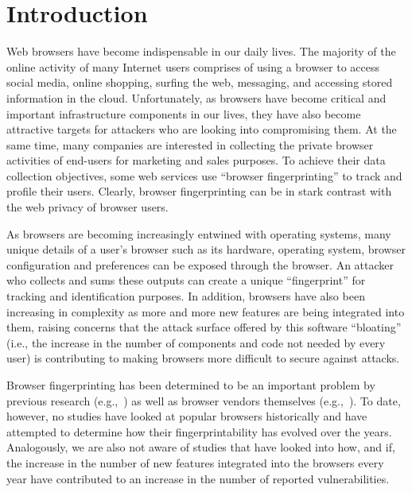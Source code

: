 \section{Introduction}
\label{sec:introduction}

Web browsers have become indispensable in our daily lives. The
majority of the online activity of many Internet users comprises of
using a browser to access social media, online shopping, surfing the
web, messaging, and accessing stored information in the cloud.
Unfortunately, as browsers have become critical and important
infrastructure components in our lives, they have also become
attractive targets for attackers who are looking into compromising
them. At the same time, many companies are interested in collecting
the private browser activities of end-users for marketing and sales
purposes. To achieve their data collection objectives, some web
services use ``browser fingerprinting'' to track and profile their
users. Clearly, browser fingerprinting can be in stark contrast with
the web privacy of browser users.

As browsers are becoming increasingly entwined with operating systems,
many unique details of a user's browser such as its hardware,
operating system, browser configuration and preferences can be exposed
through the browser. An attacker who collects and sums these outputs
can create a unique ``fingerprint'' for tracking and identification
purposes. In addition, browsers have also been increasing in
complexity as more and more new features are being integrated into
them, raising concerns that the attack surface offered by this
software ``bloating'' (i.e., the increase in the number of components
and code not needed by every user) is contributing to making browsers
more difficult to secure against attacks.

Browser fingerprinting has been determined to be an important problem
by previous research
(e.g.,~\cite{cookiemonster-SP13,panopticlick,mowery2012pixel,fpdetective})
as well as browser vendors themselves (e.g.,~\cite{safari-privacy,
  brave-fpbudget, firefox-fingerprinting}). To date, however, no
studies have looked at popular browsers historically and have
attempted to determine how their fingerprintability has evolved over
the years. Analogously, we are also not aware of studies that have
looked into how, and if, the increase in the number of new features
integrated into the browsers every year have contributed to an
increase in the number of reported vulnerabilities.

